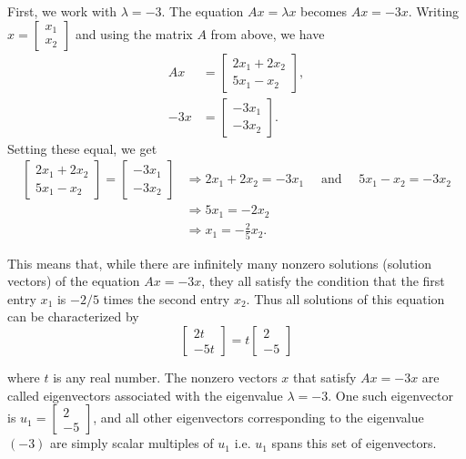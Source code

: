 \begin{example}
First, we work with \( \lambda = -3 \). The equation \( Ax = \lambda x \) becomes \( Ax = -3x \). Writing \( x = \begin{bmatrix} x_1 \\ x_2 \end{bmatrix} \) and using the matrix \( A \) from above, we have 
\[
\begin{aligned}
    Ax &= \begin{bmatrix} 2x_1 + 2x_2 \\ 5x_1 - x_2 \end{bmatrix}, \\
    -3x &= \begin{bmatrix} -3x_1 \\ -3x_2 \end{bmatrix}.
\end{aligned}
\]
Setting these equal, we get
$$
\begin{aligned}
{\left[\begin{array}{c}
2 x_1+2 x_2 \\
5 x_1-x_2
\end{array}\right]=\left[\begin{array}{c}
-3 x_1 \\
-3 x_2
\end{array}\right] } & \Rightarrow 2 x_1+2 x_2=-3 x_1 \quad \text { and } \quad 5 x_1-x_2=-3 x_2 \\
& \Rightarrow 5 x_1=-2 x_2 \\
& \Rightarrow x_1=-\frac{2}{5} x_2 .
\end{aligned}
$$

This means that, while there are infinitely many nonzero solutions (solution vectors) of the equation ${A x}=-3 {x}$, they all satisfy the condition that the first entry $x_1$ is $-2 / 5$ times the second entry $x_2$. Thus all solutions of this equation can be characterized by
$$
\left[\begin{array}{c}
2 t \\
-5 t
\end{array}\right]=t\left[\begin{array}{c}
2 \\
-5
\end{array}\right]
$$

 where \( t \) is any real number. The nonzero vectors \( x \) that satisfy \( Ax = -3x \) are called eigenvectors associated with the eigenvalue \( \lambda = -3 \). One such eigenvector is \( u_1 = \begin{bmatrix} 2 \\ -5 \end{bmatrix} \), and all other eigenvectors corresponding to the eigenvalue \((-3)\) are simply scalar multiples of \( u_1 \) i.e. \( u_1 \) spans this set of eigenvectors.


\end{example}
